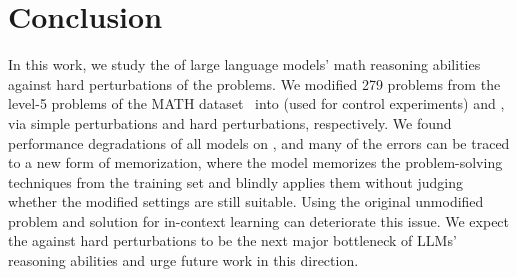 \section{Conclusion}
In this work, we study the  of large language models' math reasoning abilities against hard perturbations of the problems. We modified 279 problems from the level-5 problems of the MATH dataset~\citep{hendrycksmath2021} into \SAME (used for control experiments) and \HARD, via simple perturbations and hard perturbations, respectively. We found performance degradations of all models on \HARD, and many of the errors can be traced to a new form of memorization, where the model memorizes the problem-solving techniques from the training set and blindly applies them without judging whether the modified settings are still suitable. Using the original unmodified problem and solution for in-context learning can deteriorate this issue. We expect the  against hard perturbations to be the next major bottleneck of LLMs' reasoning abilities and urge future work in this direction.


